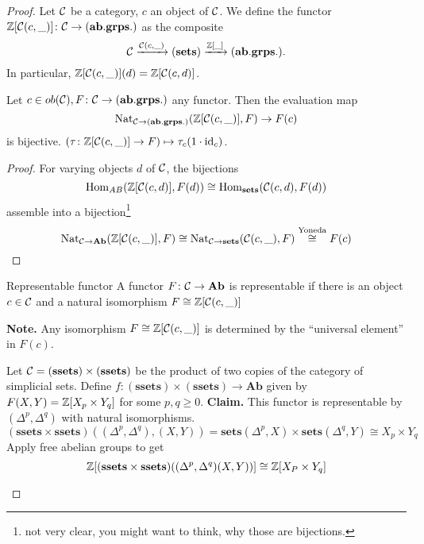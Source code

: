 \documentclass[language=english]{TemplateLecture}
\begin{document}
\begin{proof}
    Let \(\mathcal{C}\) be a category, \(c\) an object of \(\mathcal{C}\). We define the functor \(\mathbb{Z}[\mathcal{C}(c,\_)]\colon \mathcal{C} \to (\mathbf{ab.grps.})\) as the composite
    \[\mathcal{C} \xrightarrow{\mathcal{C}(c,\_)} (\mathbf{sets}) \xrightarrow{\mathbb{Z}[\_]} (\mathbf{ab.grps.}).\]
    In particular, \(\mathbb{Z}[\mathcal{C}(c, \_)] (d) = \mathbb{Z}[\mathcal{C}(c,d)]\).
    \begin{Proposition}
        Let \(c \in ob(\mathcal{C}), F\colon \mathcal{C} \to (\mathbf{ab.grps.})\) any functor. Then the evaluation map
        \[\mathrm{Nat}_{\mathcal{C} \to (\mathbf{ab.grps.})}(\mathbb{Z}[\mathcal{C}(c,\_)], F) \to F(c)\]
        is bijective. \((\tau\colon \mathbb{Z}[\mathcal{C}(c, \_)] \to F) \mapsto \tau_c(1\cdot \operatorname{id}_c)\).
    \end{Proposition}
    \begin{proof}
        For varying objects \(d\) of \(\mathcal{C}\), the bijections
        \[\operatorname{Hom}_{AB}(\mathbb{Z}[\mathcal{C}(c,d)], F(d)) \cong \operatorname{Hom}_{\mathbf{sets}}(\mathcal{C}(c,d), F(d))\]
        assemble into a bijection\footnote{not very clear, you might want to think, why those are bijections.}
        \[\mathrm{Nat}_{\mathcal{C} \to \mathbf{Ab}}(\mathbb{Z}[\mathcal{C}(c, \_)], F) \cong \mathrm{Nat}_{\mathcal{C} \to \mathbf{sets}}(\mathcal{C}(c, \_), F) \overset{\text{Yoneda}}{\cong} F(c)\]
    \end{proof}
    \begin{defi}{Representable functor}{}
        A functor \(F\colon \mathcal{C} \to \mathbf{Ab}\) is representable if there is an object \(c \in \mathcal{C}\) and a natural isomorphism \(F\cong \mathbb{Z}[\mathcal{C}(c,\_)]\)
    \end{defi}
    \textbf{Note.} Any isomorphism \(F \cong \mathbb{Z}[\mathcal{C}(c,\_)]\) is determined by the \enquote{universal element} in \(F(c)\).

    \begin{example}
        Let \(\mathcal{C} = (\mathbf{ssets}) \times (\mathbf{ssets})\) be the product of two copies of the category of simplicial sets. Define \(f\colon (\mathbf{ssets})\times (\mathbf{ssets}) \to \mathbf{Ab}\) given by \(F(X,Y) = \mathbb{Z}[X_p \times Y_q]\) for some \(p,q \geq 0\).
        \textbf{Claim.} This functor is representable by \((\Delta^p, \Delta^q)\) with natural isomorphisms.
        \[(\mathbf{ssets}\times \mathbf{ssets})((\Delta^p, \Delta^q), (X,Y)) = \mathbf{sets}(\Delta^p, X) \times \mathbf{sets}(\Delta^q,Y) \cong X_p \times Y_q\]
        Apply free abelian groups to get
        \[\mathbb{Z}[(\mathbf{ssets} \times \mathbf{ssets})((\Delta^p,\Delta^q)(X,Y))] \cong \mathbb{Z}[X_P \times Y_q]\]
    \end{example}


\end{proof}
\end{document}
